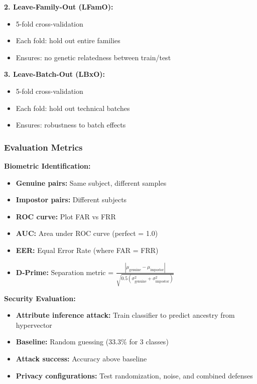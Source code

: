 \documentclass[11pt,letterpaper]{article}
\begin{document}
\textbf{2. Leave-Family-Out (LFamO):}
\begin{itemize}
\item 5-fold cross-validation
\item Each fold: hold out entire families
\item Ensures: no genetic relatedness between train/test
\end{itemize}

\textbf{3. Leave-Batch-Out (LBxO):}
\begin{itemize}
\item 5-fold cross-validation
\item Each fold: hold out technical batches
\item Ensures: robustness to batch effects
\end{itemize}

\subsubsection{Evaluation Metrics}

\textbf{Biometric Identification:}
\begin{itemize}
\item \textbf{Genuine pairs:} Same subject, different samples
\item \textbf{Impostor pairs:} Different subjects
\item \textbf{ROC curve:} Plot FAR vs FRR
\item \textbf{AUC:} Area under ROC curve (perfect = 1.0)
\item \textbf{EER:} Equal Error Rate (where FAR = FRR)
\item \textbf{D-Prime:} Separation metric = $\frac{|\mu_{\text{genuine}} - \mu_{\text{impostor}}|}{\sqrt{0.5(\sigma^2_{\text{genuine}} + \sigma^2_{\text{impostor}})}}$
\end{itemize}

\textbf{Security Evaluation:}
\begin{itemize}
\item \textbf{Attribute inference attack:} Train classifier to predict ancestry from hypervector
\item \textbf{Baseline:} Random guessing (33.3\% for 3 classes)
\item \textbf{Attack success:} Accuracy above baseline
\item \textbf{Privacy configurations:} Test randomization, noise, and combined defenses
\end{itemize}
\end{document}
